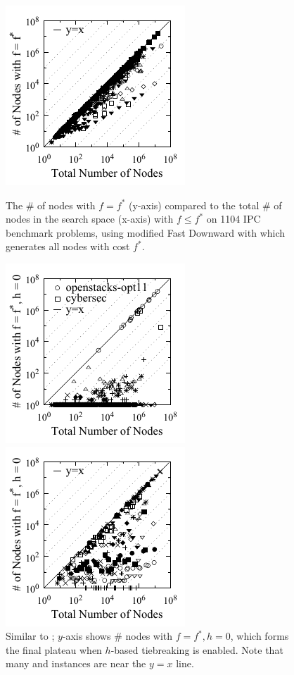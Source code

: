 \begin{figure}[htb]
 \newcommand{\minilength}{0.34\textwidth}
 \newcommand{\minisep}{0.02\textwidth}
 \begin{minipage}[t]{\minilength}
  \centering
  \includegraphics{tables/aaai16-frontier/aaai16prelim3/lmcut_frontier_noh-front-mono.pdf}
 \caption{
 The \# of nodes with $f=f^*$ (y-axis) compared to the
 total \# of nodes in the search space (x-axis) with $f\leq f^*$ on 1104 IPC benchmark problems,
  using modified Fast Downward with \lmcut which 
  generates all nodes with cost $f^*$.
  }
 \label{fig:plateau-noh}
 \end{minipage}
 \hfill
 \begin{minipage}[t]{\minilength}
  \centering
  \includegraphics{tables/aaai16-frontier/aaai16prelim3/lmcut_frontier-front-mono.pdf}
  \caption{
  Similar to ; $y$-axis shows
  \# nodes with $f=f^*, h=0$, which forms the final
  plateau when $h$-based tiebreaking is enabled.
  Note that many  and  instances are near the $y=x$ line.
  }
  \label{fig:plateau}
 \end{minipage} 
 \hfill
 \begin{minipage}[t]{0.26\textwidth}
  \centering
  \includegraphics{tables/aaai16-frontier/zerocost/lmcut_frontier-front-mono.pdf}

\end{minipage}
\end{figure}
